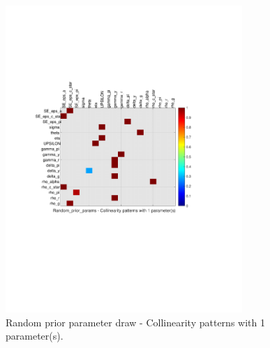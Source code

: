 
\begin{figure}[H]
\centering 
\includegraphics[width=0.8\textwidth]{monetary/identification/monetary_ident_collinearity_Random_prior_params_1}
\caption{Random prior parameter draw  - Collinearity patterns with 1 parameter(s).}\label{Fig:collinearity:Random_prior_params:1_pars}
\end{figure}

